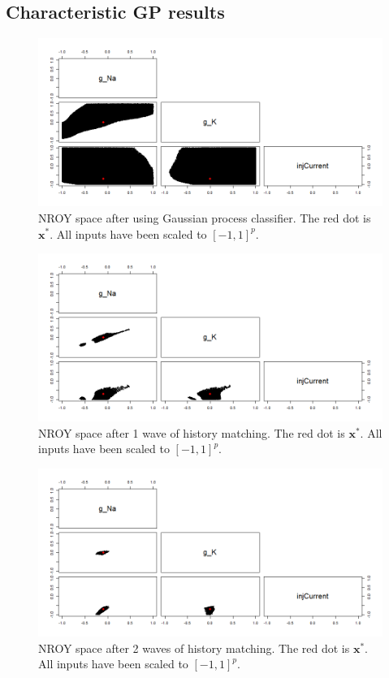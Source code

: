 \documentclass{article}
\newcommand{\inputVec}{\mathbf{x}}
\begin{document}
\subsection{Characteristic GP results}
\begin{figure}[t]
    \centering
    \includegraphics[width=\linewidth]{Example1/char0.png}
    \caption{NROY space after using Gaussian process classifier. The red dot is $\inputVec^*$. All inputs have been scaled to $[-1,1]^p$.}
    \label{fig:ex1-char0}
\end{figure}
\begin{figure}
    \centering
    \includegraphics[width=\linewidth]{Example1/char1.png}
    \caption{NROY space after 1 wave of history matching. The red dot is $\inputVec^*$. All inputs have been scaled to $[-1,1]^p$.}
    \label{fig:ex1-char1}
\end{figure}
\begin{figure}[t]
    \centering
    \includegraphics[width=\linewidth]{Example1/char2.png}
    \caption{NROY space after 2 waves of history matching. The red dot is $\inputVec^*$. All inputs have been scaled to $[-1,1]^p$.}
    \label{fig:ex1-char2}
\end{figure}
\end{document}
